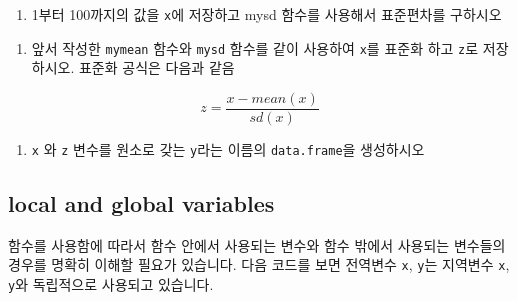 \documentclass[
  a4paper,
]{book}
\providecommand{\tightlist}{%
  \setlength{\itemsep}{0pt}\setlength{\parskip}{0pt}}\usepackage{longtable,booktabs,array}
\begin{document}
\begin{enumerate}
\def\labelenumi{\arabic{enumi})}
\setcounter{enumi}{1}
\tightlist
\item
  1부터 100까지의 값을 \texttt{x}에 저장하고 mysd 함수를 사용해서
  표준편차를 구하시오
\end{enumerate}

\begin{enumerate}
\def\labelenumi{\arabic{enumi})}
\setcounter{enumi}{2}
\tightlist
\item
  앞서 작성한 \texttt{mymean} 함수와 \texttt{mysd} 함수를 같이 사용하여
  \texttt{x}를 표준화 하고 \texttt{z}로 저장하시오. 표준화 공식은 다음과
  같음
\end{enumerate}

\[ 
z = \frac{x - mean(x)}{sd(x)}
\]

\begin{enumerate}
\def\labelenumi{\arabic{enumi})}
\setcounter{enumi}{3}
\tightlist
\item
  \texttt{x} 와 \texttt{z} 변수를 원소로 갖는 \texttt{y}라는 이름의
  \texttt{data.frame}을 생성하시오
\end{enumerate}

\hypertarget{local-and-global-variables}{%
\subsection{local and global
variables}\label{local-and-global-variables}}

함수를 사용함에 따라서 함수 안에서 사용되는 변수와 함수 밖에서 사용되는
변수들의 경우를 명확히 이해할 필요가 있습니다. 다음 코드를 보면 전역변수
\texttt{x}, \texttt{y}는 지역변수 \texttt{x}, \texttt{y}와 독립적으로
사용되고 있습니다.
\end{document}
